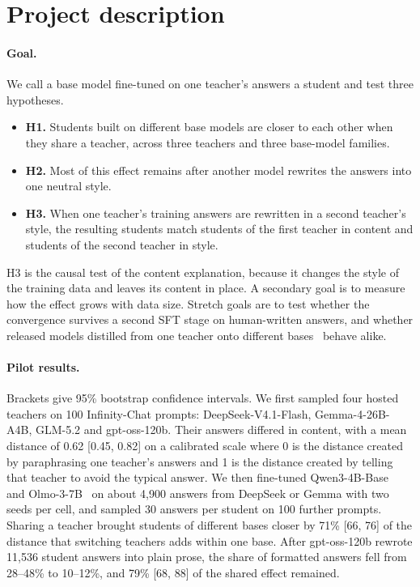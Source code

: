 \documentclass{article}
\begin{document}
\section{Project description}
\label{sec:description}

\paragraph{Goal.}
We call a base model fine-tuned on one teacher's answers a student and test three hypotheses.
\begin{itemize}
    \item \textbf{H1.} Students built on different base models are closer to each other when they share a teacher, across three teachers and three base-model families.
    \item \textbf{H2.} Most of this effect remains after another model rewrites the answers into one neutral style.
    \item \textbf{H3.} When one teacher's training answers are rewritten in a second teacher's style, the resulting students match students of the first teacher in content and students of the second teacher in style.
\end{itemize}
H3 is the causal test of the content explanation, because it changes the style of the training data and leaves its content in place. A secondary goal is to measure how the effect grows with data size. Stretch goals are to test whether the convergence survives a second SFT stage on human-written answers, and whether released models distilled from one teacher onto different bases~\cite{deepseek2025r1} behave alike.

\paragraph{Pilot results.}
Brackets give 95\% bootstrap confidence intervals. We first sampled four hosted teachers on 100 Infinity-Chat prompts: DeepSeek-V4.1-Flash, Gemma-4-26B-A4B, GLM-5.2 and gpt-oss-120b. Their answers differed in content, with a mean distance of 0.62 [0.45, 0.82] on a calibrated scale where 0 is the distance created by paraphrasing one teacher's answers and 1 is the distance created by telling that teacher to avoid the typical answer. We then fine-tuned Qwen3-4B-Base~\cite{yang2025qwen3} and Olmo-3-7B~\cite{olmo2025olmo3} on about 4,900 answers from DeepSeek or Gemma with two seeds per cell, and sampled 30 answers per student on 100 further prompts. Sharing a teacher brought students of different bases closer by 71\% [66, 76] of the distance that switching teachers adds within one base. After gpt-oss-120b rewrote 11,536 student answers into plain prose, the share of formatted answers fell from 28--48\% to 10--12\%, and 79\% [68, 88] of the shared effect remained.
\end{document}
